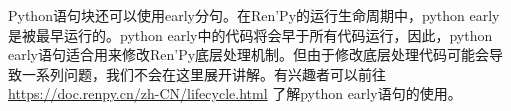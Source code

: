 \documentclass[../../Main.tex]{subfiles}
\begin{document}
\begin{ExtraKnowledge}
    Python语句块还可以使用early分句。在Ren'Py的运行生命周期中，python early是被最早运行的。python early中的代码将会早于所有代码运行，因此，python early语句适合用来修改Ren'Py底层处理机制。但由于修改底层处理代码可能会导致一系列问题，我们不会在这里展开讲解。有兴趣者可以前往 \url{https://doc.renpy.cn/zh-CN/lifecycle.html} 了解python early语句的使用。
\end{ExtraKnowledge}
\end{document}
